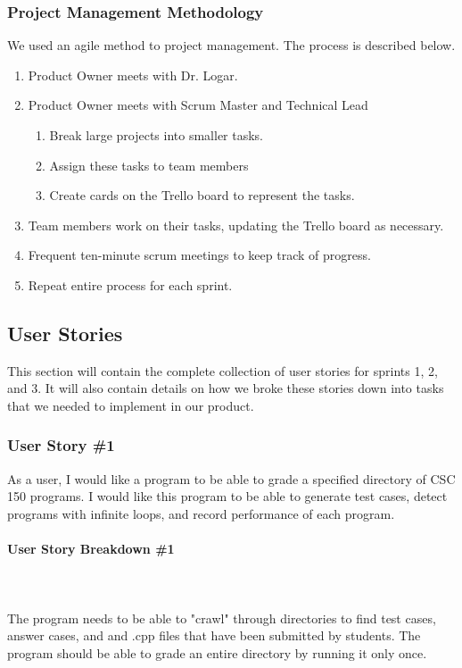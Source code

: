 \documentclass {article}
\begin{document}
	 		 \subsubsection{\large{\color{cyan}Project Management Methodology}}
	 		 	We used an agile method to project management. The process is
	 		 	 described below.
	 		 	\begin{enumerate}
	 		 		\item Product Owner meets with Dr. Logar.
	 		 		\item Product Owner meets with Scrum Master and Technical Lead
	 		 			\begin{enumerate}
	 		 				\item Break large projects into smaller tasks.
	 		 				\item Assign these tasks to team members
	 		 				\item Create cards on the Trello board to represent
	 		 				 the tasks.
	 		 			\end{enumerate}
	 		 		\item Team members work on their tasks, updating the Trello
	 		 		 board as necessary.
	 		 		\item Frequent ten-minute scrum meetings to keep track of
	 		 		 progress.
	 		 		\item Repeat entire process for each sprint.
	 		 	\end{enumerate}
	 		 	
	 	\subsection{\Large{\color{blue}User Stories}}
	 		This section will contain the complete collection of user stories for
	 		 sprints 1, 2, and 3. It will also contain details on how we broke
	 		 these stories down into tasks that we needed to implement in our
	 		 product.
	 		 
	 		\subsubsection{\large{\color{cyan}User Story \#1}}
	 			As a user, I would like a program to be able to grade a specified
	 			 directory of CSC 150 programs. I would like this program to be
	 			 able to generate test cases, detect programs with infinite loops,
	 			 and record performance of each program.
	 			 
	 			\paragraph{\textbf{User Story Breakdown \#1}}
	 				\ \\ \ \\The program needs to be able to "crawl" through directories to
	 				 find test cases, answer cases, and and .cpp files that have been
	 				 submitted by students. The program should be able to grade an
	 				 entire directory by running it only once.		 				 
	 				 
\end{document}

